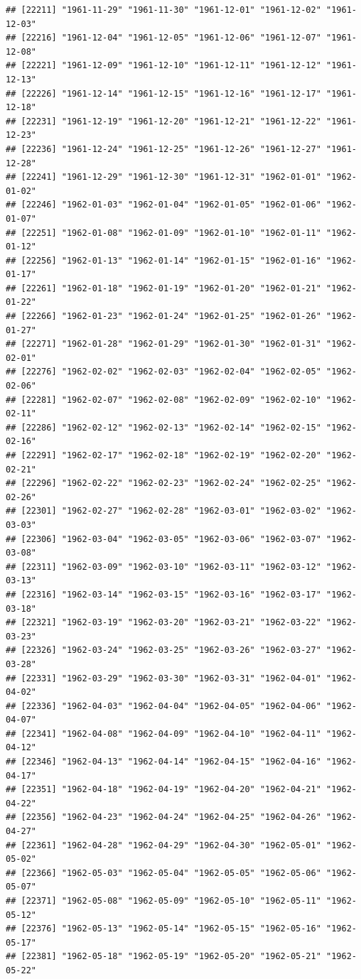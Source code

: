 \documentclass{article}\usepackage[]{graphicx}\usepackage[]{color}
\makeatletter
\newenvironment{kframe}{%
 \def\at@end@of@kframe{}%
 \ifinner\ifhmode%
  \def\at@end@of@kframe{\end{minipage}}%
  \begin{minipage}{\columnwidth}%
 \fi\fi%
 \def\FrameCommand##1{\hskip\@totalleftmargin \hskip-\fboxsep
 \colorbox{shadecolor}{##1}\hskip-\fboxsep
     \hskip-\linewidth \hskip-\@totalleftmargin \hskip\columnwidth}%
 \MakeFramed {\advance\hsize-\width
   \@totalleftmargin\z@ \linewidth\hsize
   \@setminipage}}%
 {\par\unskip\endMakeFramed%
 \at@end@of@kframe}
\newenvironment{knitrout}{}{} %
\makeatother
\begin{document}
\begin{description}
\begin{knitrout}
\begin{kframe}
\begin{verbatim}
## [22211] "1961-11-29" "1961-11-30" "1961-12-01" "1961-12-02" "1961-12-03"
## [22216] "1961-12-04" "1961-12-05" "1961-12-06" "1961-12-07" "1961-12-08"
## [22221] "1961-12-09" "1961-12-10" "1961-12-11" "1961-12-12" "1961-12-13"
## [22226] "1961-12-14" "1961-12-15" "1961-12-16" "1961-12-17" "1961-12-18"
## [22231] "1961-12-19" "1961-12-20" "1961-12-21" "1961-12-22" "1961-12-23"
## [22236] "1961-12-24" "1961-12-25" "1961-12-26" "1961-12-27" "1961-12-28"
## [22241] "1961-12-29" "1961-12-30" "1961-12-31" "1962-01-01" "1962-01-02"
## [22246] "1962-01-03" "1962-01-04" "1962-01-05" "1962-01-06" "1962-01-07"
## [22251] "1962-01-08" "1962-01-09" "1962-01-10" "1962-01-11" "1962-01-12"
## [22256] "1962-01-13" "1962-01-14" "1962-01-15" "1962-01-16" "1962-01-17"
## [22261] "1962-01-18" "1962-01-19" "1962-01-20" "1962-01-21" "1962-01-22"
## [22266] "1962-01-23" "1962-01-24" "1962-01-25" "1962-01-26" "1962-01-27"
## [22271] "1962-01-28" "1962-01-29" "1962-01-30" "1962-01-31" "1962-02-01"
## [22276] "1962-02-02" "1962-02-03" "1962-02-04" "1962-02-05" "1962-02-06"
## [22281] "1962-02-07" "1962-02-08" "1962-02-09" "1962-02-10" "1962-02-11"
## [22286] "1962-02-12" "1962-02-13" "1962-02-14" "1962-02-15" "1962-02-16"
## [22291] "1962-02-17" "1962-02-18" "1962-02-19" "1962-02-20" "1962-02-21"
## [22296] "1962-02-22" "1962-02-23" "1962-02-24" "1962-02-25" "1962-02-26"
## [22301] "1962-02-27" "1962-02-28" "1962-03-01" "1962-03-02" "1962-03-03"
## [22306] "1962-03-04" "1962-03-05" "1962-03-06" "1962-03-07" "1962-03-08"
## [22311] "1962-03-09" "1962-03-10" "1962-03-11" "1962-03-12" "1962-03-13"
## [22316] "1962-03-14" "1962-03-15" "1962-03-16" "1962-03-17" "1962-03-18"
## [22321] "1962-03-19" "1962-03-20" "1962-03-21" "1962-03-22" "1962-03-23"
## [22326] "1962-03-24" "1962-03-25" "1962-03-26" "1962-03-27" "1962-03-28"
## [22331] "1962-03-29" "1962-03-30" "1962-03-31" "1962-04-01" "1962-04-02"
## [22336] "1962-04-03" "1962-04-04" "1962-04-05" "1962-04-06" "1962-04-07"
## [22341] "1962-04-08" "1962-04-09" "1962-04-10" "1962-04-11" "1962-04-12"
## [22346] "1962-04-13" "1962-04-14" "1962-04-15" "1962-04-16" "1962-04-17"
## [22351] "1962-04-18" "1962-04-19" "1962-04-20" "1962-04-21" "1962-04-22"
## [22356] "1962-04-23" "1962-04-24" "1962-04-25" "1962-04-26" "1962-04-27"
## [22361] "1962-04-28" "1962-04-29" "1962-04-30" "1962-05-01" "1962-05-02"
## [22366] "1962-05-03" "1962-05-04" "1962-05-05" "1962-05-06" "1962-05-07"
## [22371] "1962-05-08" "1962-05-09" "1962-05-10" "1962-05-11" "1962-05-12"
## [22376] "1962-05-13" "1962-05-14" "1962-05-15" "1962-05-16" "1962-05-17"
## [22381] "1962-05-18" "1962-05-19" "1962-05-20" "1962-05-21" "1962-05-22"

\end{verbatim}
\end{kframe}
\end{knitrout}
\end{description}
\end{document}
